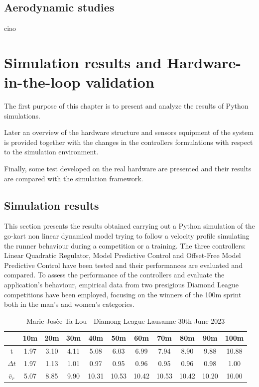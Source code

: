 \documentclass[a4paper,12pt,oneside]{book}
\begin{document}
\section{Aerodynamic studies}
ciao


\chapter{Simulation results and Hardware-in-the-loop validation}
\label{chapter:Simulations_and_results}
The first purpose of this chapter is to present and analyze the results of Python simulations.

Later an overview of the hardware structure and sensors equipment of the system is provided together with the changes in the controllers formulations with respect to the simulation environment. 

Finally, some test developed on the real hardware are presented and their results are compared with the simulation framework.

\section{Simulation results}
This section presents the results obtained carrying out a Python simulation of the go-kart non linear dynamical model trying to follow a velocity profile simulating the runner behaviour during a competition or a training.
The three controllers: Linear Quadratic Regulator, Model Predictive Control and Offset-Free Model Predictive Control have been tested and their performances are evaluated and compared.
To assess the performance of the controllers and evaluate the application's behaviour, empirical data from two presigious Diamond League competitions have been employed, focusing on the winners of the 100m sprint both in the man's and women's categories.

\begin{table}[h!]
	\centering
	\begin{adjustbox}{max width=\textwidth}
	\begin{tabular}{c|c|c|c|c|c|c|c|c|c|c}
           & 10m & 20m & 30m & 40m & 50m & 60m & 70m & 80m & 90m &100m \\
	\hline
	\hline
	t & 1.97 & 3.10 & 4.11 & 5.08 & 6.03 & 6.99 & 7.94 & 8.90 & 9.88 & 10.88  \\	
	$\Delta t$ & 1.97 & 1.13 & 1.01 & 0.97 & 0.95 & 0.96 & 0.95 & 0.96 & 0.98 & 1.00 \\
	$\bar{v}_r$ & 5.07 & 8.85 & 9.90 & 10.31 & 10.53 & 10.42 & 10.53 & 10.42 & 10.20 & 10.00 \\
	\hline
	\end{tabular}
	\end{adjustbox}
\caption{Marie-Josèe Ta-Lou - Diamong League Lausanne 30th June 2023}
\label{tab:Women}
\end{table}
\end{document}
